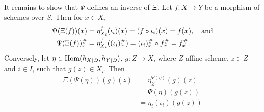 \documentclass[a5paper,11pt,english]{article}
\newcommand{\Dd}{\mathcal{D}}
\begin{document}
\begin{exercise}[2]
\begin{enumerate}
It remains to show that $\Psi$ defines an inverse of $\Xi$. Let $f : X \to Y$ be
a morphism of schemes over $S$. Then for $x \in X_i$ 
\begin{align*}
\Psi(\Xi(f))(x) &= \eta^f_{X_i}(\iota_i)(x) = (f \circ \iota_i)(x) = f(x), \quad
\text{and} \\
\Psi(\Xi(f))_x^\# &= \eta^f_{X_i} ( (\iota_i)_x^\# ) = (\iota_i)_x^\# \circ
f_x^\# = f_x^\#.
\end{align*}
Conversely, let $\eta \in \Hom({h_X}_{|\Dd}, {h_Y}_{|\Dd})$, $g: Z \to X$, where
$Z$ affine scheme, $z \in Z$ and $i \in I$, such that $g(z) \in X_i$. Then
\begin{align*}
\Xi(\Psi(\eta))(g)(z) &= \eta_Z^{\Psi(\eta)} (g)(z) \\
&= \Psi(\eta) (g(z)) \\
&= \eta_i(\iota_i)(g(z))
\end{align*}
\end{enumerate}


\end{exercise}
\end{document}
